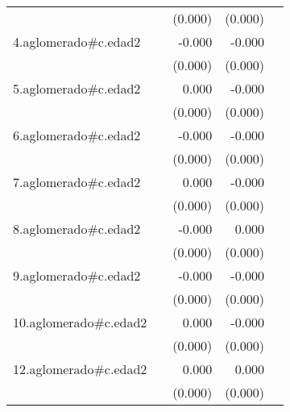 {\begin{longtable}{l*{4}{D{.}{.}{-1}}}
            &                     &     (0.000)         &     (0.000)         &                     \\
\addlinespace
4.aglomerado#c.edad2&                     &      -0.000         &      -0.000\sym{***}&                     \\
            &                     &     (0.000)         &     (0.000)         &                     \\
\addlinespace
5.aglomerado#c.edad2&                     &       0.000         &      -0.000         &                     \\
            &                     &     (0.000)         &     (0.000)         &                     \\
\addlinespace
6.aglomerado#c.edad2&                     &      -0.000         &      -0.000\sym{**} &                     \\
            &                     &     (0.000)         &     (0.000)         &                     \\
\addlinespace
7.aglomerado#c.edad2&                     &       0.000         &      -0.000\sym{*}  &                     \\
            &                     &     (0.000)         &     (0.000)         &                     \\
\addlinespace
8.aglomerado#c.edad2&                     &      -0.000         &       0.000         &                     \\
            &                     &     (0.000)         &     (0.000)         &                     \\
\addlinespace
9.aglomerado#c.edad2&                     &      -0.000\sym{*}  &      -0.000\sym{***}&                     \\
            &                     &     (0.000)         &     (0.000)         &                     \\
\addlinespace
10.aglomerado#c.edad2&                     &       0.000         &      -0.000         &                     \\
            &                     &     (0.000)         &     (0.000)         &                     \\
\addlinespace
12.aglomerado#c.edad2&                     &       0.000\sym{*}  &       0.000         &                     \\
            &                     &     (0.000)         &     (0.000)         &                     \\

\end{longtable}}
